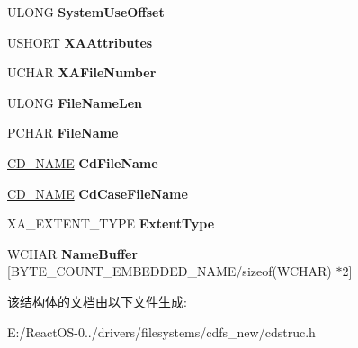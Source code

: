 \begin{DoxyCompactItemize}
\mbox{\label{struct___d_i_r_e_n_t_a707118336d6233895ca1b5e7ca5df60f}} 
U\+L\+O\+NG {\bfseries System\+Use\+Offset}
\item 
\mbox{\label{struct___d_i_r_e_n_t_a5ec1ef3ed6f4289d15856fef6c46f3b6}} 
U\+S\+H\+O\+RT {\bfseries X\+A\+Attributes}
\item 
\mbox{\label{struct___d_i_r_e_n_t_aeb6353c4d472820863de663e78e2d108}} 
U\+C\+H\+AR {\bfseries X\+A\+File\+Number}
\item 
\mbox{\label{struct___d_i_r_e_n_t_ad5bdb4acbce5b74e3320f42c102c8642}} 
U\+L\+O\+NG {\bfseries File\+Name\+Len}
\item 
\mbox{\label{struct___d_i_r_e_n_t_aab2022cfd406993315e029f3ba1cacdb}} 
P\+C\+H\+AR {\bfseries File\+Name}
\item 
\mbox{\label{struct___d_i_r_e_n_t_a624d511c05fcc43238572f172485052d}} 
\hyperlink{struct___c_d___n_a_m_e}{C\+D\+\_\+\+N\+A\+ME} {\bfseries Cd\+File\+Name}
\item 
\mbox{\label{struct___d_i_r_e_n_t_af50f0a6c181401356b34a99eb73f4f3a}} 
\hyperlink{struct___c_d___n_a_m_e}{C\+D\+\_\+\+N\+A\+ME} {\bfseries Cd\+Case\+File\+Name}
\item 
\mbox{\label{struct___d_i_r_e_n_t_a1846b8071d33478b7d1232c5d24d238f}} 
X\+A\+\_\+\+E\+X\+T\+E\+N\+T\+\_\+\+T\+Y\+PE {\bfseries Extent\+Type}
\item 
\mbox{\label{struct___d_i_r_e_n_t_abb91449151a34a682cf983acc330176f}} 
W\+C\+H\+AR {\bfseries Name\+Buffer} \mbox{[}B\+Y\+T\+E\+\_\+\+C\+O\+U\+N\+T\+\_\+\+E\+M\+B\+E\+D\+D\+E\+D\+\_\+\+N\+A\+ME/sizeof(W\+C\+H\+AR) $\ast$2\mbox{]}
\end{DoxyCompactItemize}


该结构体的文档由以下文件生成\+:\begin{DoxyCompactItemize}
\item 
E\+:/\+React\+O\+S-\/0../drivers/filesystems/cdfs\+\_\+new/cdstruc.\+h\end{DoxyCompactItemize}
